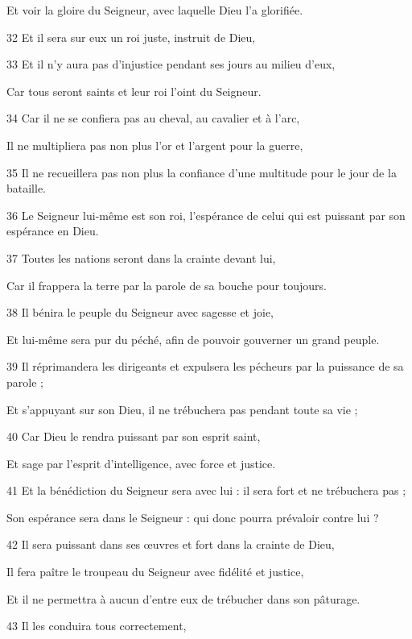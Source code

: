 \par     Et voir la gloire du Seigneur, avec laquelle Dieu l'a glorifiée.
\par 32 Et il sera sur eux un roi juste, instruit de Dieu,
\par 33 Et il n'y aura pas d'injustice pendant ses jours au milieu d'eux,
\par     Car tous seront saints et leur roi l'oint du Seigneur.
\par 34 Car il ne se confiera pas au cheval, au cavalier et à l'arc,
\par     Il ne multipliera pas non plus l'or et l'argent pour la guerre,
\par   
\par 35 Il ne recueillera pas non plus la confiance d'une multitude pour le jour de la bataille.
\par 36 Le Seigneur lui-même est son roi, l'espérance de celui qui est puissant par son espérance en Dieu.
\par   
\par 37 Toutes les nations seront dans la crainte devant lui,
\par     Car il frappera la terre par la parole de sa bouche pour toujours.
\par 38 Il bénira le peuple du Seigneur avec sagesse et joie,
\par     Et lui-même sera pur du péché, afin de pouvoir gouverner un grand peuple.
\par 39 Il réprimandera les dirigeants et expulsera les pécheurs par la puissance de sa parole ;
\par     Et s'appuyant sur son Dieu, il ne trébuchera pas pendant toute sa vie ;
\par 40 Car Dieu le rendra puissant par son esprit saint,
\par     Et sage par l'esprit d'intelligence, avec force et justice.
\par 41 Et la bénédiction du Seigneur sera avec lui : il sera fort et ne trébuchera pas ;
\par     Son espérance sera dans le Seigneur : qui donc pourra prévaloir contre lui ?
\par 42 Il sera puissant dans ses œuvres et fort dans la crainte de Dieu,
\par     Il fera paître le troupeau du Seigneur avec fidélité et justice,
\par     Et il ne permettra à aucun d'entre eux de trébucher dans son pâturage.
\par 43 Il les conduira tous correctement,

